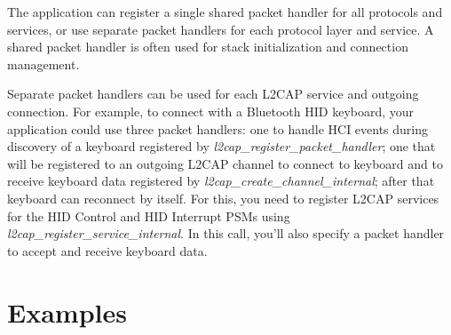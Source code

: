 \documentclass[a4paper,titlepage,oneside,12pt]{amsart} %
\newcommand{\urlfoot}[2]{\href{#1}{{\color{blue} #2}}\footnote{#1}}
\begin{document}
The application can register a single shared packet handler for all protocols and services, or use separate packet handlers for each protocol layer and service. A shared packet handler is often used for stack initialization and connection management.

Separate packet handlers can be used for each L2CAP service and outgoing connection. For example, to connect with a Bluetooth HID keyboard, your application could use three packet handlers: one to handle HCI events during discovery of a keyboard registered by \emph{l2cap\_register\_packet\_handler}; one that will be registered to an outgoing L2CAP channel to connect to keyboard and to receive keyboard data registered by \emph{l2cap\_create\_channel\_internal}; after that keyboard can reconnect by itself. For this, you need to register L2CAP services for the HID Control and HID Interrupt PSMs using \emph{l2cap\_register\_service\_internal}. In this call, you'll also specify a packet handler to accept and receive keyboard data. 

\newcommand{\BluetoothSpecification}{\urlfoot{https://www.bluetooth.org/Technical/Specifications/adopted.htm}{Bluetooth Specification}}
\newcommand{\BluetoothSpecificationURL}{\href{https://www.bluetooth.org/Technical/Specifications/adopted.htm}{\color{blue} Bluetooth Specification}}



\pagebreak
\section{Examples}
\end{document}
